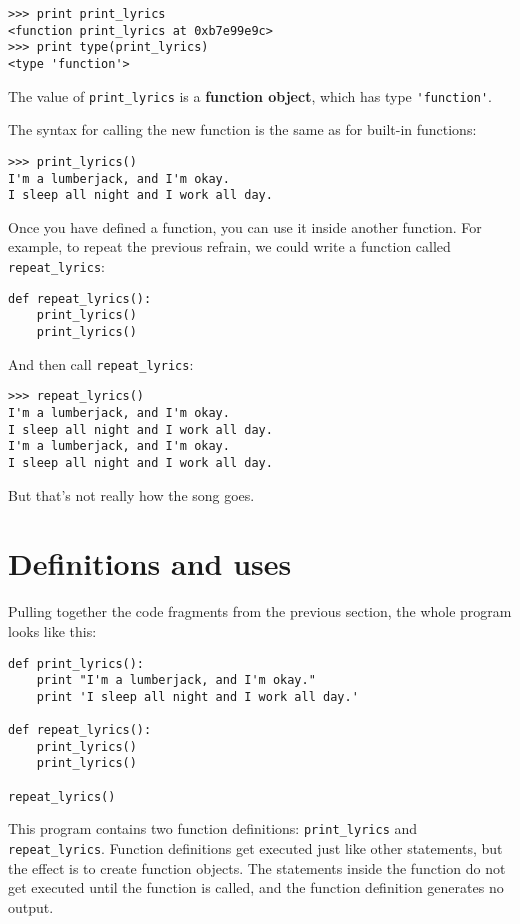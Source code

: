 \beforeverb
\begin{verbatim}
>>> print print_lyrics
<function print_lyrics at 0xb7e99e9c>
>>> print type(print_lyrics)
<type 'function'>
\end{verbatim}
\afterverb
%
The value of \verb"print_lyrics" is a {\bf function object}, which
has type \verb"'function'".


The syntax for calling the new function is the same as
for built-in functions:

\beforeverb
\begin{verbatim}
>>> print_lyrics()
I'm a lumberjack, and I'm okay.
I sleep all night and I work all day.
\end{verbatim}
\afterverb
%
Once you have defined a function, you can use it inside another
function.  For example, to repeat the previous refrain, we could write
a function called \verb"repeat_lyrics":

\beforeverb
\begin{verbatim}
def repeat_lyrics():
    print_lyrics()
    print_lyrics()
\end{verbatim}
\afterverb
%
And then call \verb"repeat_lyrics":

\beforeverb
\begin{verbatim}
>>> repeat_lyrics()
I'm a lumberjack, and I'm okay.
I sleep all night and I work all day.
I'm a lumberjack, and I'm okay.
I sleep all night and I work all day.
\end{verbatim}
\afterverb
%
But that's not really how the song goes.


\section{Definitions and uses}

Pulling together the code fragments from the previous section, the
whole program looks like this:

\beforeverb
\begin{verbatim}
def print_lyrics():
    print "I'm a lumberjack, and I'm okay."
    print 'I sleep all night and I work all day.'

def repeat_lyrics():
    print_lyrics()
    print_lyrics()

repeat_lyrics()
\end{verbatim}
\afterverb
%
This program contains two function definitions: \verb"print_lyrics" and
\verb"repeat_lyrics".  Function definitions get executed just like other
statements, but the effect is to create function objects.  The statements
inside the function do not get executed until the function is called, and
the function definition generates no output.

